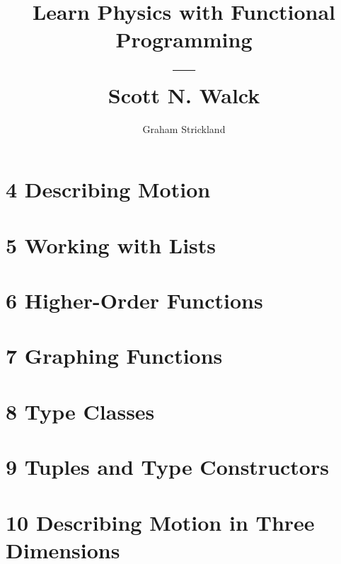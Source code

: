 \documentclass{article}
\title{Learn Physics with Functional Programming\\---\\Scott N. Walck}
\author{Graham Strickland}
\begin{document}
\maketitle  

\section*{4 Describing Motion}


\section*{5 Working with Lists}


\section*{6 Higher-Order Functions}


\section*{7 Graphing Functions}


\section*{8 Type Classes}


\section*{9 Tuples and Type Constructors}


\section*{10 Describing Motion in Three Dimensions}

\end{document}
